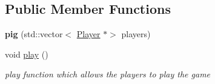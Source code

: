 \subsection*{Public Member Functions}
\begin{DoxyCompactItemize}
\item 
\mbox{\label{classpig_a14f66c6f931e7f88e887d1af8e06eadc}} 
{\bfseries pig} (std\+::vector$<$ \hyperlink{classPlayer}{Player} $\ast$$>$ players)
\item 
void \hyperlink{classpig_a83fd8571e2f33ec33f6fafd7efa96571}{play} ()
\begin{DoxyCompactList}\small\item\em play function which allows the players to play the game \end{DoxyCompactList}\end{DoxyCompactItemize}
